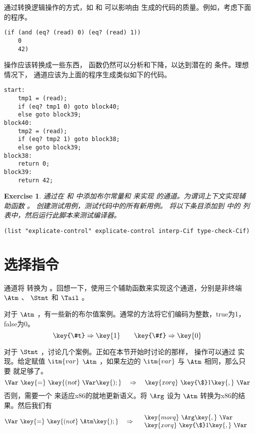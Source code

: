 \documentclass[11pt]{book}
\newtheorem{exercise}[theorem]{Exercise}
\begin{document}
  通过转换逻辑操作的方式，如  和  可以影响由  生成的代码的质量。例如，考虑下面的程序。
\begin{lstlisting}
(if (and (eq? (read) 0) (eq? (read) 1))
    0
    42)  
\end{lstlisting}
  操作应该转换成一些东西，
 函数仍然可以分析和下降，以达到潜在的  条件。理想情况下，
 通道应该为上面的程序生成类似如下的代码。
\begin{center}
\begin{lstlisting}
start:
    tmp1 = (read);
    if (eq? tmp1 0) goto block40;
    else goto block39;
block40:
    tmp2 = (read);
    if (eq? tmp2 1) goto block38;
    else goto block39;
block38:
    return 0;
block39:
    return 42;
\end{lstlisting}
\end{center}

\begin{exercise}\normalfont
通过在  和
 中添加布尔常量和  来实现  的通道。为谓词上下文实现辅助函数
 。
%
创建测试用例，测试代码中的所有新用例。
%
将以下条目添加到
 中的    列表中，然后运行此脚本来测试编译器。
\begin{lstlisting}
(list "explicate-control" explicate-control interp-Cif type-check-Cif)
\end{lstlisting}

\end{exercise}


\section{选择指令}
\label{sec:select-Rif}

  通道将 \LangCIf{} 转换为
\LangXIfVar{} 。回想一下，使用三个辅助函数来实现这个通道，分别是非终端 $\Atm$ 、
$\Stmt$ 和 $\Tail$ 。

对于 $\Atm$ ，有一些新的布尔值案例。通常的方法将它们编码为整数，true为1，false为0。
\[
\key{\#t} \Rightarrow \key{1}
\qquad
\key{\#f} \Rightarrow \key{0}
\]

对于 $\Stmt$ ，讨论几个案例。正如在本节开始时讨论的那样，  操作可以通过  实现。给定赋值
$\itm{var}$ \key{=}  $\Atm$\key{);} ，如果左边的 $\itm{var}$ 与
 $\Atm$ 相同，那么只要  就足够了。
\[
\Var~\key{=}~ \key{(not}\; \Var\key{);}
\quad\Rightarrow\quad
\key{xorq}~\key{\$}1\key{,}~\Var
\]
否则，需要一个  来适应x86的就地更新语义。将 $\Arg$ 设为 $\Atm$ 转换为x86的结果。然后我们有
\[
\Var~\key{=}~ \key{(not}\; \Atm\key{);}
\quad\Rightarrow\quad
\begin{array}{l}
\key{movq}~\Arg\key{,}~\Var\\
\key{xorq}~\key{\$}1\key{,}~\Var
\end{array}
\]
\end{document}
